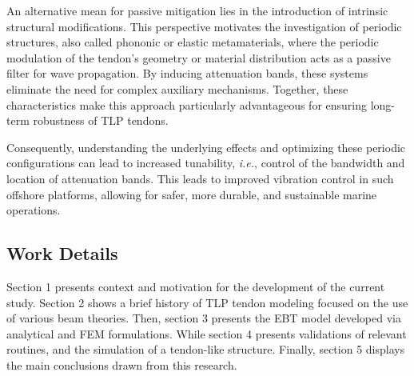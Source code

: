 An alternative mean for passive mitigation lies in the introduction of intrinsic structural modifications. This perspective motivates the investigation of periodic structures, also called phononic or elastic metamaterials, where the periodic modulation of the tendon's geometry or material distribution acts as a passive filter for wave propagation. By inducing attenuation bands, these systems eliminate the need for complex auxiliary mechanisms. Together, these characteristics make this approach particularly advantageous for ensuring long-term robustness of TLP tendons.


Consequently, understanding the underlying effects and optimizing these periodic configurations can lead to increased tunability, \textit{i.e.}, control of the bandwidth and location of attenuation bands. This leads to improved vibration control in such offshore platforms, allowing for safer, more durable, and sustainable marine operations.

\subsection{Work Details}

Section 1 presents context and motivation for the development of the current study. Section 2 shows a brief history of TLP tendon modeling focused on the use of various beam theories. Then, section 3 presents the EBT model developed via analytical and FEM formulations. While section 4 presents validations of relevant routines, and the simulation of a tendon-like structure. Finally, section 5 displays the main conclusions drawn from this research.
